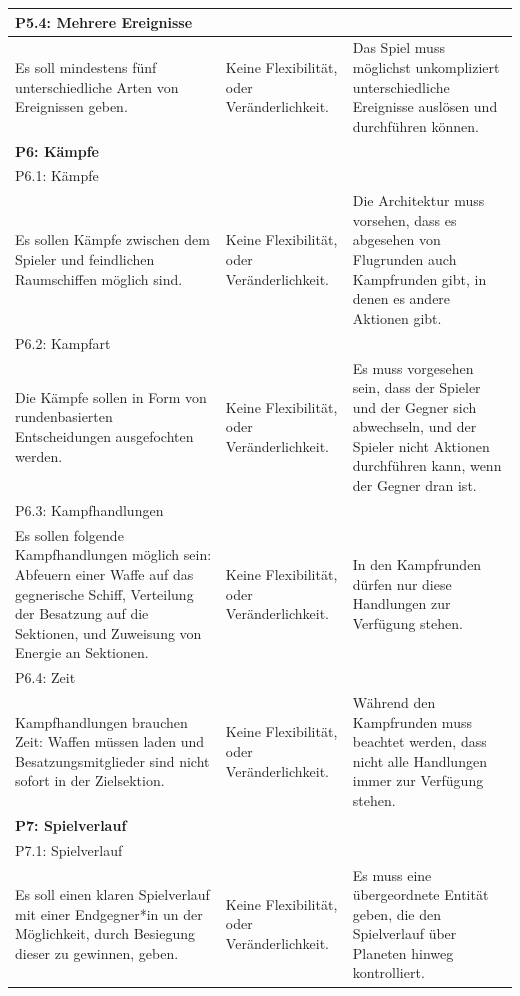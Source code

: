 \documentclass[fontsize=12pt,paper=a4,twoside]{scrartcl}
\begin{document}
\begin{longtable}[c]{|p{5cm}|p{5cm}|p{5cm}|}
\\ \hline
\multicolumn{3}{|l|}{{P5.4: Mehrere Ereignisse}} 
\\ \hline
Es soll mindestens fünf unterschiedliche Arten von Ereignissen geben. & Keine Flexibilität, oder Veränderlichkeit.    & Das Spiel muss möglichst unkompliziert unterschiedliche Ereignisse auslösen und durchführen können. 
\\ \hline
%
\multicolumn{3}{|l|}{{\textbf{P6: Kämpfe}}} 
\\ \hline
\multicolumn{3}{|l|}{{P6.1: Kämpfe}} 
\\ \hline
Es sollen Kämpfe zwischen dem Spieler und feindlichen Raumschiffen möglich sind. & Keine Flexibilität, oder Veränderlichkeit.    & Die Architektur muss vorsehen, dass es abgesehen von Flugrunden auch Kampfrunden gibt, in denen es andere Aktionen gibt.
\\ \hline
\multicolumn{3}{|l|}{{P6.2: Kampfart}} 
\\ \hline
Die Kämpfe sollen in Form von rundenbasierten Entscheidungen ausgefochten werden. & Keine Flexibilität, oder Veränderlichkeit.    &  Es muss vorgesehen sein, dass der Spieler und der Gegner sich abwechseln, und der Spieler nicht Aktionen durchführen kann, wenn der Gegner dran ist. 
\\ \hline
\multicolumn{3}{|l|}{{P6.3: Kampfhandlungen}} 
\\ \hline
Es sollen folgende Kampfhandlungen möglich sein: Abfeuern einer Waffe auf das gegnerische Schiff, Verteilung der Besatzung auf die Sektionen, und Zuweisung von Energie an Sektionen. & Keine Flexibilität, oder Veränderlichkeit.    &  In den Kampfrunden dürfen nur diese Handlungen zur Verfügung stehen.
\\ \hline
\multicolumn{3}{|l|}{{P6.4: Zeit}} 
\\ \hline
Kampfhandlungen brauchen Zeit: Waffen müssen laden und Besatzungsmitglieder sind nicht sofort in der Zielsektion. & Keine Flexibilität, oder Veränderlichkeit.    & Während den Kampfrunden muss beachtet werden, dass nicht alle Handlungen immer zur Verfügung stehen. 
\\ \hline
%
\multicolumn{3}{|l|}{{\textbf{P7: Spielverlauf}}} 
\\ \hline
\multicolumn{3}{|l|}{{P7.1: Spielverlauf}} 
\\ \hline
Es soll einen klaren Spielverlauf mit einer Endgegner*in un der Möglichkeit, durch Besiegung dieser zu gewinnen, geben.  & Keine Flexibilität, oder Veränderlichkeit.    & Es muss eine übergeordnete Entität geben, die den Spielverlauf über Planeten hinweg kontrolliert. 

\end{longtable}
\end{document}
